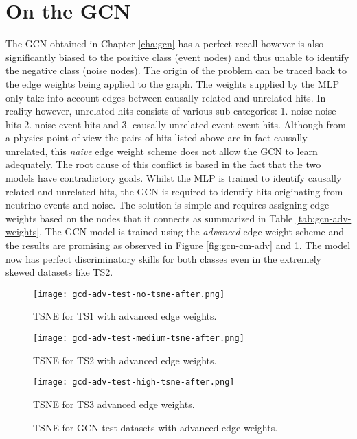 \section{On the GCN}
The GCN obtained in Chapter \ref{cha:gcn} has a perfect recall however
is also significantly biased to the positive class (event nodes) and
thus unable to identify the negative class (noise nodes). The origin
of the problem can be traced back to the edge weights being applied to
the graph. The weights supplied by the MLP only take into account
edges between causally related and unrelated hits. In reality however,
unrelated hits consists of various sub categories: 1. noise-noise hits
2. noise-event hits and 3. causally unrelated event-event hits.
Although from a physics point of view the pairs of hits listed above
are in fact causally unrelated, this \emph{naive} edge weight scheme
does not allow the GCN to learn adequately. The root cause of this
conflict is based in the fact that the two models have contradictory
goals. Whilst the MLP is trained to identify causally related and
unrelated hits, the GCN is required to identify hits originating from
neutrino events and noise. The solution is simple and requires
assigning edge weights based on the nodes that it connects as
summarized in Table \ref{tab:gcn-adv-weights}. The GCN model is
trained using the \emph{advanced} edge weight scheme and the results
are promising as observed in Figure \ref{fig:gcn-cm-adv} and
\ref{fig:gcn-test-tsne-adv}. The model now has perfect discriminatory
skills for both classes even in the extremely skewed datasets like
TS2.

\begin{figure}[htb]
  \begin{minipage}{0.32\textwidth}
    \centering
    \texttt{[image: gcd-adv-test-no-tsne-after.png]}
    \caption{TSNE for TS1 with advanced edge weights.}
  \end{minipage}
  \begin{minipage}{0.32\textwidth}
    \centering
    \texttt{[image: gcd-adv-test-medium-tsne-after.png]}
    \caption{TSNE for TS2 with advanced edge weights.}
  \end{minipage}
  \begin{minipage}{0.32\textwidth}
    \centering
    \texttt{[image: gcd-adv-test-high-tsne-after.png]}
    \caption{TSNE for TS3 advanced edge weights.}
  \end{minipage}
  \caption{TSNE for GCN test datasets with advanced edge weights.}
  \label{fig:gcn-test-tsne-adv}
\end{figure}

